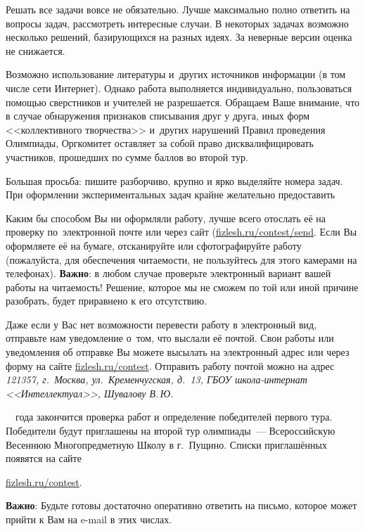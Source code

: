 \documentclass[a4paper,12pt]{article}
\begin{document}
Решать все задачи вовсе не обязательно. Лучше максимально полно ответить на вопросы задач,
рассмотреть интересные случаи. В некоторых задачах возможно несколько решений, базирующихся
на разных идеях. За неверные версии оценка не снижается.


\bigskip


Возможно использование литературы и~других источников информации (в том числе сети Интернет).
Однако работа выполняется индивидуально, пользоваться помощью сверстников и учителей не разрешается.
Обращаем Ваше внимание, что в случае обнаружения признаков списывания друг у друга,
иных форм <<коллективного творчества>> и~других нарушений Правил проведения Олимпиады,
Оргкомитет оставляет за собой право дисквалифицировать участников, прошедших по сумме баллов во второй тур.


\bigskip


Большая просьба: пишите разборчиво, крупно и ярко выделяйте номера задач.
При оформлении экспериментальных задач крайне желательно предоставить

Каким бы способом Вы ни оформляли работу, лучше всего отослать её на проверку по~электронной
почте или через сайт (\href{http://fizlesh.ru/contest/send}{fizlesh.ru/contest/send}.
Если Вы оформляете её на бумаге, отсканируйте или сфотографируйте работу
(пожалуйста, для обеспечения читаемости, не пользуйтесь для этого камерами на телефонах).
\textbf{Важно}: в любом случае проверьте электронный вариант вашей работы на читаемость!
Решение, которое мы не сможем по той или иной причине разобрать, будет приравнено к его отсутствию.

Даже если у Вас нет возможности перевести работу в электронный вид, отправьте нам уведомление
о~том, что выслали её почтой. Свои работы или уведомления об отправке Вы можете высылать
на электронный адрес \href{mailto:\olympmail}{\olympmail}
или через форму на сайте \href{http://fizlesh.ru/contest}{fizlesh.ru/contest}.
Отправить работу почтой можно на адрес \emph{121357, г.~Москва, ул.~Кременчугская, д.~13, ГБОУ школа-интернат
<<Интеллектуал>>, Шувалову В.\,Ю.}


\bigskip


\olympcheckend~\olympyearend~года закончится проверка работ и определение победителей первого тура.
Победители будут приглашены на второй тур олимпиады~--- Всероссийскую Весеннюю Многопредметную Школу
в г.~Пущино. Списки приглашённых появятся на сайте\\
\centerline{\href{http://fizlesh.ru/contest}{fizlesh.ru/contest}.}
\textbf{Важно}: Будьте готовы достаточно оперативно ответить на письмо, которое может
прийти к Вам на e-mail в этих числах.
\end{document}
